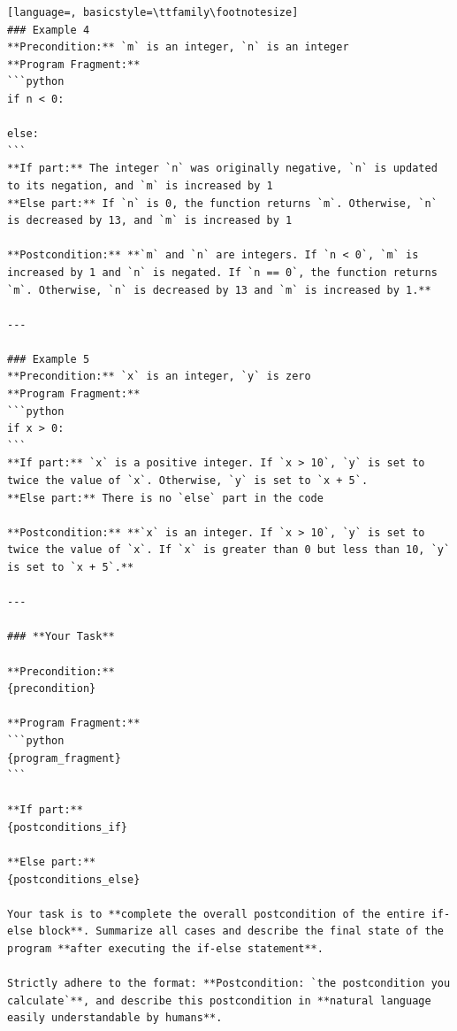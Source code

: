 \documentclass[sigconf]{acmart}
\begin{document}
\begin{tcolorbox}[ colback=gray!10, colframe=black, arc=5pt]
\begin{lstlisting}[language=, basicstyle=\ttfamily\footnotesize]
### Example 4  
**Precondition:** `m` is an integer, `n` is an integer  
**Program Fragment:**  
```python
if n < 0:
    
else:
```
**If part:** The integer `n` was originally negative, `n` is updated to its negation, and `m` is increased by 1  
**Else part:** If `n` is 0, the function returns `m`. Otherwise, `n` is decreased by 13, and `m` is increased by 1  

**Postcondition:** **`m` and `n` are integers. If `n < 0`, `m` is increased by 1 and `n` is negated. If `n == 0`, the function returns `m`. Otherwise, `n` is decreased by 13 and `m` is increased by 1.**

---

### Example 5  
**Precondition:** `x` is an integer, `y` is zero  
**Program Fragment:**  
```python
if x > 0:
```
**If part:** `x` is a positive integer. If `x > 10`, `y` is set to twice the value of `x`. Otherwise, `y` is set to `x + 5`.  
**Else part:** There is no `else` part in the code  

**Postcondition:** **`x` is an integer. If `x > 10`, `y` is set to twice the value of `x`. If `x` is greater than 0 but less than 10, `y` is set to `x + 5`.**

---

### **Your Task**

**Precondition:**  
{precondition}

**Program Fragment:**  
```python
{program_fragment}
```

**If part:**  
{postconditions_if}

**Else part:**  
{postconditions_else}

Your task is to **complete the overall postcondition of the entire if-else block**. Summarize all cases and describe the final state of the program **after executing the if-else statement**.

Strictly adhere to the format: **Postcondition: `the postcondition you calculate`**, and describe this postcondition in **natural language easily understandable by humans**.

\end{lstlisting}
\end{tcolorbox}
\end{document}
